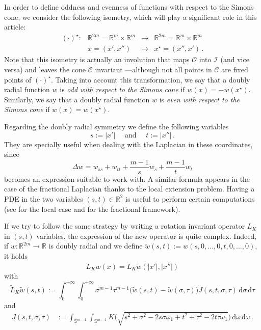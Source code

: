 \documentclass[12pt,reqno]{amsart}
\theoremstyle{definition}
\theoremstyle{remark}
\newcommand{\con}[1]{\mathbb{#1}}
\newcommand{\R}{\con{R}} %
\newcommand{\Sph}{\con{S}} %
\newcommand{\ccal}{\mathscr{C}}
\newcommand{\ical}{\mathcal{I}}
\newcommand{\ocal}{\mathcal{O}}
\renewcommand{\d}{\,\mathrm{d}} %
\numberwithin{equation}{section}
\begin{document}
	In order to define oddness and evenness of functions with respect to the Simons cone, we consider the following isometry, which will play a significant role in this article:
	\begin{equation}
	\label{Eq:DefStar}
	\begin{matrix}
	(\cdot)^\star \colon & \R^{2m}= \R^{m}\times \R^{m}  &\to&  \R^{2m}= \R^{m}\times \R^{m}  \\
	& x = (x',x'') &\mapsto & x^\star = (x'',x')\,.
	\end{matrix}
	\end{equation}
	Note that this isometry is actually an involution that maps $\ocal$ into $\ical$ (and vice versa) and leaves the cone $\ccal$ invariant ---although not all points in $\ccal$ are fixed points of $(\cdot)^\star$. Taking into account this transformation, we say that a doubly radial function $w$ is \emph{odd with respect to the Simons cone} if $w(x) = -w(x^\star)$. Similarly, we say that a doubly radial function $w$ is \emph{even with respect to the Simons cone} if $w(x) = w(x^\star)$.
	
	Regarding the doubly radial symmetry we define the following variables
	$$
	s := |x'| \quad \text{ and } \quad t:=|x''|\,.
	$$
	They are specially useful when dealing with the Laplacian in these coordinates, since
	\begin{equation}
	\label{Eq:Laplacian-st}
	\Delta w = w_{ss} + w_{tt} + \frac{m-1}{s}w_s + \frac{m-1}{t}w_t
	\end{equation}
	becomes an expression suitable to work with. A similar formula appears in the case of the fractional Laplacian thanks to the local extension problem. Having a PDE in the two variables $(s,t)\in \R^2$ is useful to perform certain computations (see \cite{CabreTerraI, CabreTerraII,Cabre-Saddle, CabreRosOton-DoubleRev} for the local case and \cite{Cinti-Saddle, Cinti-Saddle2, Felipe-Sanz-Perela:SaddleFractional} for the fractional framework).
	
	If we try to follow the same strategy by writing a rotation invariant operator $L_K$ in $(s,t)$ variables, the expression of the new operator is quite complex. Indeed, if $w:\R^{2m} \to \R$ is doubly radial and we define $\widetilde{w}(s,t) := w(s,0,...,0,t,0,...,0)$, it holds
	$$ L_Kw(x) = \widetilde{L}_K \widetilde{w} (|x'|,|x''|)$$
	with
	\begin{equation}
	\label{Eq:L_K-st}
	\widetilde{L}_K \widetilde{w} (s,t) := \int_0^{+\infty}  \int_0^{+\infty} \sigma^{m-1} \tau^{m-1} \big(\widetilde{w}(s,t) - \widetilde{w}(\sigma, \tau)\big) J(s,t,\sigma, \tau)  \d \sigma\d \tau
	\end{equation}
	and
	\begin{align*}
	J(s,t,\sigma, \tau) &:= \int_{\Sph^{m-1}}  \int_{\Sph^{m-1}} K\Big( \sqrt{s^2+\sigma^2- 2 s \sigma \omega_1 + t^2 + \tau^2 - 2t \tau\tilde\omega_1}\Big) \d \omega \d \tilde\omega\,.
	\end{align*}
	
\end{document}

